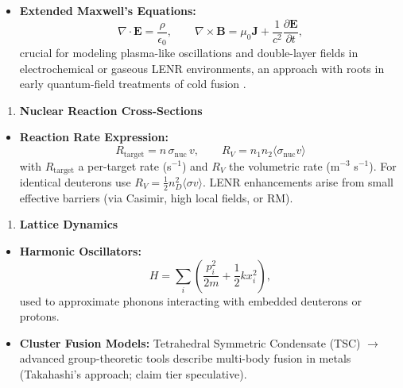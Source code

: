 \documentclass[11pt,a4paper]{article}
\begin{document}
\begin{itemize}
\item
  \textbf{Extended Maxwell's Equations:} \begin{equation}
\nabla\cdot\mathbf{E} = \frac{\rho}{\epsilon_0}, \qquad \nabla\times\mathbf{B} = \mu_0\mathbf{J} + \frac{1}{c^2}\frac{\partial\mathbf{E}}{\partial t},
\end{equation} crucial for modeling plasma-like oscillations and double-layer fields in electrochemical or gaseous LENR environments, an approach with roots in early quantum-field treatments of cold fusion \citep{schwinger1990}.
\end{itemize}

\begin{enumerate}
\def\labelenumi{\arabic{enumi}.}
\setcounter{enumi}{3}
\item
  \textbf{Nuclear Reaction Cross-Sections}
\end{enumerate}

\begin{itemize}
\item
  \textbf{Reaction Rate Expression:} \begin{equation}
R_{\text{target}} = n\,\sigma_{\text{nuc}}\,v, \qquad R_V = n_1 n_2\langle\sigma_{\text{nuc}} v\rangle
\end{equation} with $R_{\text{target}}$ a per-target rate (s$^{-1}$) and $R_V$ the volumetric rate (m$^{-3}$ s$^{-1}$). For identical deuterons use $R_V=\tfrac12 n_D^2\langle\sigma v\rangle$. LENR enhancements arise from small effective barriers (via Casimir, high local fields, or RM).
\end{itemize}

\begin{enumerate}
\def\labelenumi{\arabic{enumi}.}
\setcounter{enumi}{4}
\item
  \textbf{Lattice Dynamics}
\end{enumerate}

\begin{itemize}
\item
  \textbf{Harmonic Oscillators:} \begin{equation}
H = \sum_i\left(\frac{p_i^2}{2m} + \frac{1}{2}k x_i^2\right),
\end{equation} used to approximate phonons interacting with embedded deuterons or protons.
\item
  \textbf{Cluster Fusion Models:} Tetrahedral Symmetric Condensate (TSC) $\rightarrow$ advanced group-theoretic tools describe multi-body fusion in metals (Takahashi's approach; claim tier speculative).
\end{itemize}
\end{document}

